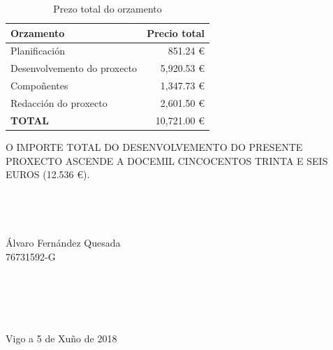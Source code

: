 \documentclass[11pt,twoside]{book}
\begin{document}
\begin{table}[htbt]
\begin{center}
    \begin{tabular}{|lr|}
    \toprule
    \rowcolor[rgb]{ .31,  .506,  .741} \textcolor[rgb]{ 1,  1,  1}{\textbf{Orzamento}} & \multicolumn{1}{l|}{\textcolor[rgb]{ 1,  1,  1}{\textbf{Precio total}}} \\
    \midrule
    \rowcolor[rgb]{ .863,  .902,  .945} Planificación & 851.24 \euro\\
    \midrule
    Desenvolvemento do proxecto & 5,920.53 \euro \\
    \midrule
    \rowcolor[rgb]{ .863,  .902,  .945} Compoñentes & 1,347.73 \euro \\
    \midrule
    Redacción do proxecto & 2,601.50 \euro \\
    \midrule
    \rowcolor[rgb]{ .863,  .902,  .945} \textbf{TOTAL} & 10,721.00 \euro \\
    \bottomrule
    \end{tabular}%
\caption{Prezo total do orzamento}
\label{PrezoTotal}
\end{center}
\end{table}

O IMPORTE TOTAL DO DESENVOLVEMENTO DO PRESENTE PROXECTO ASCENDE A DOCEMIL CINCOCENTOS TRINTA E SEIS EUROS (12.536 \euro).
\\
\\
\\
\\
\\
Álvaro Fernández Quesada \\
76731592-G
\\
\\
\\
\\
\\
\\
Vigo a 5 de Xuño de 2018

\stopcontents[parts]

\cleardoublepage
\end{document}
